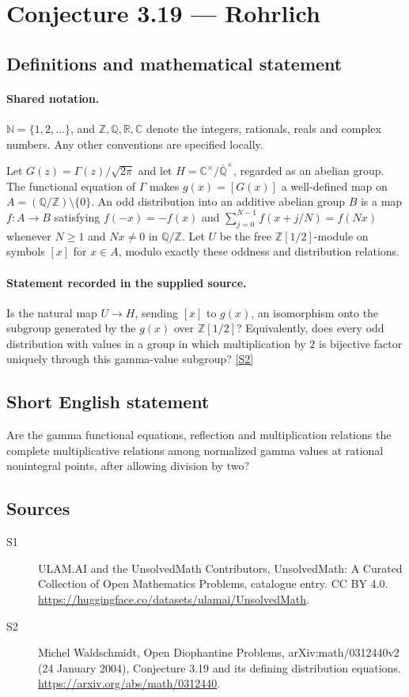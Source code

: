 \documentclass[11pt]{article}
\newcommand{\sref}[2]{\hyperlink{source:#1:#2}{[S#2]}}
\begin{document}
\section{Conjecture 3.19 — Rohrlich}\label{statement}

\subsection{Definitions and mathematical statement}

\paragraph{Shared notation.}$\mathbb N=\{1,2,\ldots\}$, and $\mathbb Z,\mathbb Q,\mathbb R,\mathbb C$ denote the integers, rationals, reals and complex numbers. Any other conventions are specified locally.


Let $G(z)=\Gamma(z)/\sqrt{2\pi}$ and let $H=\mathbb C^\times/\overline{\mathbb Q}^{\times}$, regarded as an abelian group. The functional equation of $\Gamma$ makes $g(x)=[G(x)]$ a well-defined map on $A=(\mathbb Q/\mathbb Z)\setminus\{0\}$. An odd distribution into an additive abelian group $B$ is a map $f:A\to B$ satisfying $f(-x)=-f(x)$ and $\sum_{j=0}^{N-1}f(x+j/N)=f(Nx)$ whenever $N\ge1$ and $Nx\ne0$ in $\mathbb Q/\mathbb Z$. Let $U$ be the free $\mathbb Z[1/2]$-module on symbols $[x]$ for $x\in A$, modulo exactly these oddness and distribution relations.
\paragraph{Statement recorded in the supplied source.}
Is the natural map $U\to H$, sending $[x]$ to $g(x)$, an isomorphism onto the subgroup generated by the $g(x)$ over $\mathbb Z[1/2]$? Equivalently, does every odd distribution with values in a group in which multiplication by $2$ is bijective factor uniquely through this gamma-value subgroup? \sref{statement}{2}
\subsection{Short English statement}
Are the gamma functional equations, reflection and multiplication relations the complete multiplicative relations among normalized gamma values at rational nonintegral points, after allowing division by two?
\subsection{Sources}
\begin{description}
\item[\hypertarget{source:statement:1}{S1}] ULAM.AI and the UnsolvedMath Contributors, UnsolvedMath: A Curated Collection of Open Mathematics Problems, catalogue entry. CC BY 4.0. \url{https://huggingface.co/datasets/ulamai/UnsolvedMath}.
\item[\hypertarget{source:statement:2}{S2}] Michel Waldschmidt, Open Diophantine Problems, arXiv:math/0312440v2 (24 January 2004), Conjecture 3.19 and its defining distribution equations. \url{https://arxiv.org/abs/math/0312440}.
\end{description}
\label{end:statement}
\end{document}
